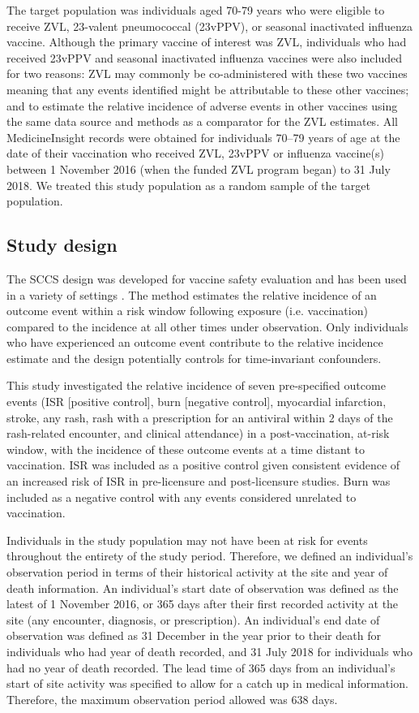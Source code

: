 \documentclass[review, endfloat]{elsarticle}
\begin{document}
The target population was individuals aged 70-79 years who were eligible to receive ZVL, 23-valent pneumococcal (23vPPV), or seasonal inactivated influenza vaccine. Although the primary vaccine of interest was ZVL, individuals who had received 23vPPV and seasonal inactivated influenza vaccines were also included for two reasons: ZVL may commonly be co-administered with these two vaccines meaning that any events identified might be attributable to these other vaccines; and to estimate the relative incidence of adverse events in other vaccines using the same data source and methods as a comparator for the ZVL estimates.  All MedicineInsight records were obtained for individuals 70–79 years of age at the date of their vaccination who received ZVL, 23vPPV or influenza vaccine(s) between 1 November 2016 (when the funded ZVL program began) to 31 July 2018. We treated this study population as a random sample of the target population. 

\subsection{Study design}

The SCCS design was developed for vaccine safety evaluation \citep{farrington1995} and has been used in a variety of settings \citep{buttery2011intussusception, bakken2015febrile, stowe2016risk}. The method estimates the relative incidence of an outcome event within a risk window following exposure (i.e. vaccination) compared to the incidence at all other times under observation. Only individuals who have experienced an outcome event contribute to the relative incidence estimate and the design potentially controls for time-invariant confounders.

This study investigated the relative incidence of seven pre-specified outcome events (ISR [positive control], burn [negative control], myocardial infarction, stroke, any rash, rash with a prescription for an antiviral within 2 days of the rash-related encounter, and clinical attendance) in a post-vaccination, at-risk window, with the incidence of these outcome events at a time distant to vaccination. ISR was included as a positive control given consistent evidence of an increased risk of ISR in pre-licensure and post-licensure studies. Burn was included as a negative control with any events considered unrelated to vaccination.

Individuals in the study population may not have been at risk for events throughout the entirety of the study period. Therefore, we defined an individual’s observation period in terms of their historical activity at the site and year of death information. An individual’s start date of observation was defined as the latest of 1 November 2016, or 365 days after their first recorded activity at the site (any encounter, diagnosis, or prescription). An individual’s end date of observation was defined as 31 December in the year prior to their death for individuals who had year of death recorded, and 31 July 2018 for individuals who had no year of death recorded. The lead time of 365 days from an individual’s start of site activity was specified to allow for a catch up in medical information. Therefore, the maximum observation period allowed was 638 days. 
\end{document}
